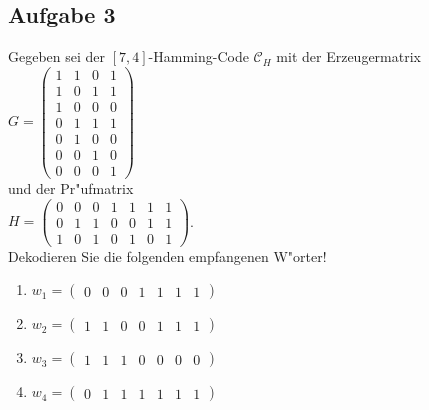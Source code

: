 \documentclass[10pt,oneside,onecolumn,a4paper,german,titlepage]{article}
\begin{document}
\subsection*{Aufgabe 3}
Gegeben sei der $[7,4]$-Hamming-Code $\mathcal{C}_H$ mit der Erzeugermatrix\\[4pt]
$G = \left( \begin{array}{cccc}
1 & 1 & 0 & 1 \\
1 & 0 & 1 & 1 \\
1 & 0 & 0 & 0 \\
0 & 1 & 1 & 1 \\
0 & 1 & 0 & 0 \\
0 & 0 & 1 & 0 \\
0 & 0 & 0 & 1
\end{array} \right)$\\[4pt]
und der Pr"ufmatrix\\[4pt]
$H = \left( \begin{array}{ccccccc}
0 & 0 & 0 & 1 & 1 & 1 & 1 \\
0 & 1 & 1 & 0 & 0 & 1 & 1 \\
1 & 0 & 1 & 0 & 1 & 0 & 1
\end{array} \right)$.\\[4pt]
Dekodieren Sie die folgenden empfangenen W"orter!
\begin{enumerate}
\item $w_1 = (\begin{array}{ccccccc}0 & 0 & 0 & 1 & 1 & 1 & 1\end{array})$
\item $w_2 = (\begin{array}{ccccccc}1 & 1 & 0 & 0 & 1 & 1 & 1\end{array})$
\item $w_3 = (\begin{array}{ccccccc}1 & 1 & 1 & 0 & 0 & 0 & 0\end{array})$
\item $w_4 = (\begin{array}{ccccccc}0 & 1 & 1 & 1 & 1 & 1 & 1\end{array})$
\end{enumerate}

\newpage
\end{document}

